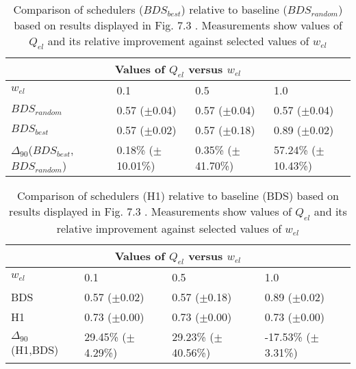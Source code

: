 \clearpage
\begin{landscape}
\begin{table}[h]
\begin{center}
\begin{tabular}{llll}
\toprule
\multicolumn{4}{c}{Values of $Q_{el}$ versus $w_{el}$}\\
\midrule
$w_{el}$ & 0.1 & 0.5 & 1.0\\
\midrule
$BDS_{random}$ &  0.57 ($\pm$0.04) &  0.57 ($\pm$0.04) &  0.57 ($\pm$0.04)\\
\midrule
$BDS_{best}$ &  0.57 ($\pm$0.02) &  0.57 ($\pm$0.18) &  0.89 ($\pm$0.02)\\
$\Delta_{90}$($BDS_{best}$,$BDS_{random}$) & 0.18\% ($\pm$10.01\%) & 0.35\% ($\pm$41.70\%) & 57.24\% ($\pm$10.43\%)\\
\bottomrule
\end{tabular}
\end{center}
\caption[Comparison of $Q_{el}$ versus $w_{el}$ for $BDS_{best}$ relative to $BDS_{random}$.]{Comparison of schedulers ($BDS_{best}$) relative to baseline ($BDS_{random}$) based on results displayed in Fig. 7.3 . Measurements show values of $Q_{el}$ and its relative improvement against selected values of $w_{el}$}
\label{b:f73a}
\end{table}
\end{landscape}


\clearpage
\begin{landscape}
\begin{table}[h]
\begin{center}
\begin{tabular}{llll}
\toprule
\multicolumn{4}{c}{Values of $Q_{el}$ versus $w_{el}$}\\
\midrule
$w_{el}$ & 0.1 & 0.5 & 1.0\\
\midrule
BDS &  0.57 ($\pm$0.02) &  0.57 ($\pm$0.18) &  0.89 ($\pm$0.02)\\
\midrule
H1 &  0.73 ($\pm$0.00) &  0.73 ($\pm$0.00) &  0.73 ($\pm$0.00)\\
$\Delta_{90}$(H1,BDS) & 29.45\% ($\pm$4.29\%) & 29.23\% ($\pm$40.56\%) & -17.53\% ($\pm$3.31\%)\\
\bottomrule
\end{tabular}
\end{center}
\caption[Comparison of $Q_{el}$ versus $w_{el}$ for H1 relative to BDS.]{Comparison of schedulers (H1) relative to baseline (BDS) based on results displayed in Fig. 7.3 . Measurements show values of $Q_{el}$ and its relative improvement against selected values of $w_{el}$}
\label{b:f73b}
\end{table}
\end{landscape}


